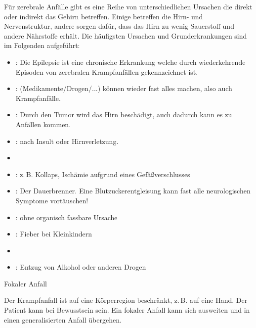 {%
Für zerebrale Anfälle gibt es eine Reihe von
unterschiedlichen Ursachen die direkt oder indirekt das
Gehirn betreffen. Einige betreffen die Hirn- und
Nervenstruktur, andere sorgen dafür, dass das Hirn zu wenig
Sauerstoff und andere Nährstoffe erhält. Die häufigsten
Ursachen und Grunderkrankungen sind im Folgenden aufgeführt:

\begin{itemize}
  \item {}: Die Epilepsie ist eine chronische
  Erkrankung welche durch wiederkehrende Episoden von
  zerebralen Krampfanfällen gekennzeichnet ist.
  \item {}: (Medikamente/Drogen/...) können
  wieder fast alles machen, also auch Krampfanfälle. \citep{Supady2009}
  \item {}: Durch den Tumor wird das Hirn
  beschädigt, auch dadurch kann es zu Anfällen kommen.
  \item {}: nach Insult oder Hirnverletzung.
  \item {}
  \item {}: z.\,B. Kollaps, Ischämie
  aufgrund eines Gefäßverschlusses
  \item {}: Der Dauerbrenner.
  Eine Blutzuckerentgleisung kann fast alle neurologischen Symptome vortäuschen!
  \item {}: ohne organisch fassbare  Ursache
  \item {}: Fieber bei Kleinkindern
  \item {}
  \item {}: Entzug von Alkohol oder anderen Drogen
\end{itemize}
}{
}{}{}{}




{Fokaler Anfall}
{%
\label{topic:krampfanfall-fokaler}
Der Krampfanfall ist auf eine Körperregion beschränkt,
z.\,B. auf eine Hand. Der Patient kann bei Bewusstsein sein.
Ein fokaler Anfall kann sich ausweiten und in einen
generalisierten Anfall übergehen.

}
{}
{}
{}
{}

